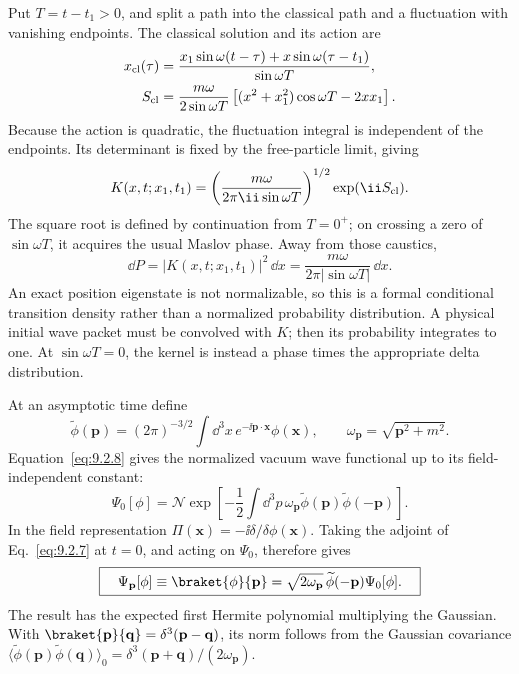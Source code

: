 \ExerciseEditorialNote

\begin{enumerate}
Put \(T=t-t_1>0\), and split a path into the classical path and a
fluctuation with vanishing endpoints.  The classical solution and its action
are
\[
 \begin{aligned}
 x_{\rm cl}(\tau)
 &=\frac{x_1\sin\omega(t-\tau)+x\sin\omega(\tau-t_1)}
         {\sin\omega T},\\
 S_{\rm cl}
 &=\frac{m\omega}{2\sin\omega T}
 \left[(x^2+x_1^2)\cos\omega T-2xx_1\right].
 \end{aligned}
\]
Because the action is quadratic, the fluctuation integral is independent of
the endpoints.  Its determinant is fixed by the free-particle limit, giving
\[
 K(x,t;x_1,t_1)=
 \left(\frac{m\omega}{2\pi \ii\sin\omega T}\right)^{1/2}
 \exp(\ii S_{\rm cl}).
\]
The square root is defined by continuation from \(T=0^+\); on crossing a
zero of \(\sin\omega T\), it acquires the usual Maslov phase.  Away from
those caustics,
\[
 \boxed{\quad
 \dd P=|K(x,t;x_1,t_1)|^2\,\dd x
 =\frac{m\omega}{2\pi|\sin\omega T|}\,\dd x .
 \quad}
\]
An exact position eigenstate is not normalizable, so this is a formal
conditional transition density rather than a normalized probability
distribution.  A physical initial wave packet must be convolved with \(K\);
then its probability integrates to one.  At
\(\sin\omega T=0\), the kernel is instead a phase times the appropriate
delta distribution.

At an asymptotic time define
\[
 \widetilde\phi(\mathbf p)
 =(2\pi)^{-3/2}\int \dd^3x\,
 e^{-\ii\mathbf p\cdot\mathbf x}\phi(\mathbf x),
\qquad \omega_{\mathbf p}=\sqrt{\mathbf p^2+m^2}.
\]
Equation~\eqref{eq:9.2.8} gives the normalized vacuum wave functional up
to its field-independent constant:
\[
 \Psi_0[\phi]=\mathcal N
 \exp\left[-\frac12\int \dd^3p\,
 \omega_{\mathbf p}\widetilde\phi(\mathbf p)
 \widetilde\phi(-\mathbf p)\right].
\]
In the field representation
\(\Pi(\mathbf x)=-\ii\delta/\delta\phi(\mathbf x)\).  Taking the adjoint of
Eq.~\eqref{eq:9.2.7} at \(t=0\), and acting on \(\Psi_0\), therefore gives
\[
 \boxed{\quad
 \Psi_{\mathbf p}[\phi]
 \equiv\braket{\phi}{\mathbf p}
 =\sqrt{2\omega_{\mathbf p}}\,
 \widetilde\phi(-\mathbf p)\Psi_0[\phi].
 \quad}
\]
The result has the expected first Hermite polynomial multiplying the
Gaussian.  With
\(\braket{\mathbf p}{\mathbf q}=\delta^3(\mathbf p-\mathbf q)\), its norm
follows from the Gaussian covariance
\(\langle\widetilde\phi(\mathbf p)
\widetilde\phi(\mathbf q)\rangle_0
=\delta^3(\mathbf p+\mathbf q)/(2\omega_{\mathbf p})\).


\end{enumerate}
